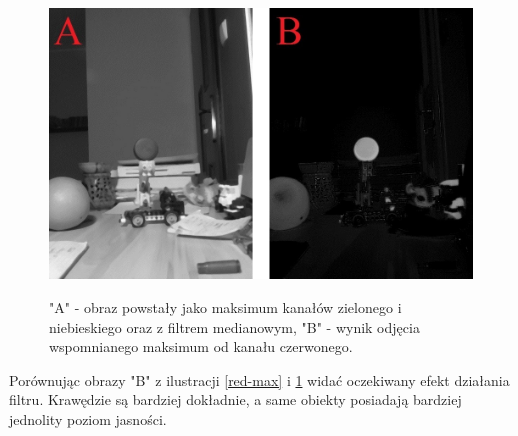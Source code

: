 \begin{figure}[H]
\begin{center}
\includegraphics[scale=0.42]{imgs/imgMax+RwoBG_med.jpg}
\caption[Kanał czerwony minus maksimum zielonego i niebieskiego z filtrem medianowym.]\small{"A" - obraz powstały jako maksimum kanałów zielonego i niebieskiego oraz z filtrem medianowym, "B" - wynik odjęcia wspomnianego maksimum od kanału czerwonego.}
\label{red-maxM}
\end{center}
\end{figure}
Porównując obrazy "B" z ilustracji \ref{red-max} i \ref{red-maxM} widać oczekiwany efekt działania filtru. Krawędzie są bardziej dokładnie, a same obiekty posiadają bardziej jednolity poziom jasności.

